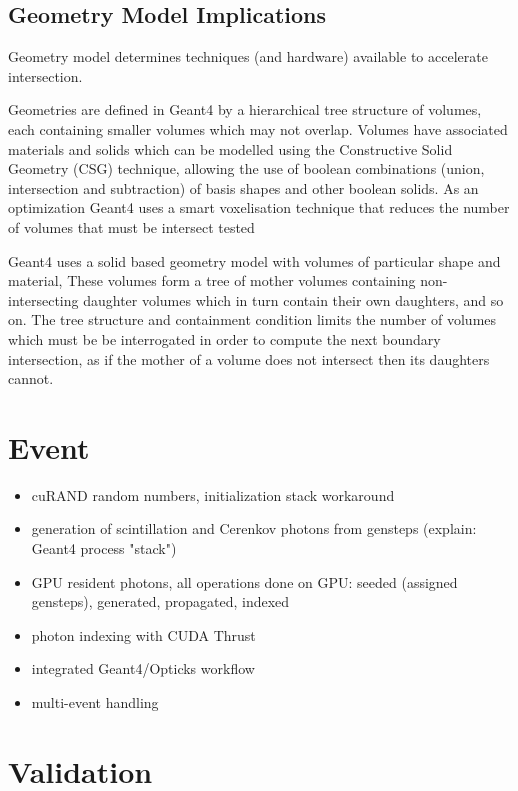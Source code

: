\documentclass[a4paper]{jpconf}
\begin{document}
\subsection{Geometry Model Implications}

Geometry model determines techniques (and hardware) available to accelerate intersection.

Geometries are defined in Geant4 by a hierarchical tree structure of volumes, each containing smaller volumes
which may not overlap. Volumes have associated materials and solids which can be modelled using 
the Constructive Solid Geometry (CSG) technique, allowing the use of 
boolean combinations (union, intersection and subtraction) of basis shapes and other boolean solids.
As an optimization Geant4 uses a smart voxelisation technique that reduces the number of volumes that
must be intersect tested  



Geant4 uses a solid based geometry model with volumes of particular shape and material,
These volumes form a tree of mother volumes
containing non-intersecting daughter volumes which in turn contain their own daughters, and so on.
The tree structure and containment condition limits the number of volumes which
must be be interrogated in order to compute the next boundary intersection, as if the
mother of a volume does not intersect then its daughters cannot.







\section{Event}

\begin{itemize}
\item cuRAND random numbers, initialization stack workaround
\item generation of scintillation and Cerenkov photons from gensteps (explain: Geant4 process "stack")
\item GPU resident photons, all operations done on GPU: seeded (assigned gensteps), generated, propagated, indexed 
\item photon indexing with CUDA Thrust 
\item integrated Geant4/Opticks workflow
\item multi-event handling 
\end{itemize}

\section{Validation}
\end{document}
